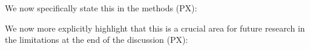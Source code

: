 \documentclass{article}
\begin{document}
\begin{enumerate}
{We now specifically state this in the methods (PX):

We now more explicitly highlight that this is a crucial area for future research in the limitations at the end of the discussion (PX):
}
\end{enumerate}
\end{document}
